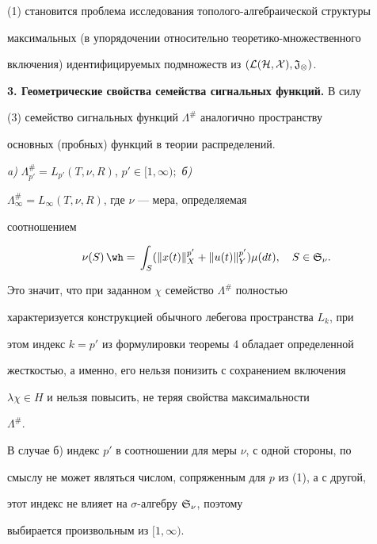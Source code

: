 (1) становится проблема исследования тополого-алгебраической структуры 


максимальных (в упорядочении относительно теоретико-множественного 


включения) идентифицируемых подмножеств из $(\cal L(H,X),\frak 


J_\Omega)$. 


\medskip 


 


{\bf 3. Геометрические свойства семейства сигнальных функций.} В силу 


(3) семейство сигнальных функций $\Lambda^{\#}$ аналогично пространству 


основных (пробных) функций в теории распределений. 


 


\begin{thm} 


{\em a)} $\Lambda^{\#}_{p'}=L_{p'}(T,\nu,R)$, $p'\in[1,\infty);$ {\em б)} 


$\Lambda^{\#}_\infty=L_\infty(T,\nu,R)$, где $\nu$ --- мера, определяемая 


соотношением 


$$ 


\nu(S)\hateq\int_S(\|x(t)\|^{p'}_X+\|u(t)\|^{p'}_Y)\mu(dt),\quad 


S\in\frak S_\nu. 


$$ 


\end{thm} 


 


Это значит, что при заданном $\chi$ семейство $\Lambda^{\#}$ полностью 


характеризуется конструкцией обычного лебегова пространства $L_k$, при 


этом индекс $k=p'$ из формулировки теоремы 4 обладает определенной 


жесткостью, а именно, его нельзя понизить с сохранением включения 


$\lambda\chi\in H$ и нельзя повысить, не теряя свойства максимальности 


$\Lambda^{\#}$. 


 


\begin{note} 


В случае б) индекс $p'$ в соотношении для меры $\nu$, с одной стороны, по 


смыслу не может являться числом, сопряженным для $p$ из (1), а с другой, 


этот индекс не влияет на $\sigma$-алгебру $\frak S_\nu$, поэтому 


выбирается произвольным из $[1,\infty)$. 


\end{note} 


